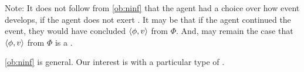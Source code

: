 \begin{note}
  Note:
  It does not follow from \autoref{ob:ninf} that the agent had a choice over how event develops, if the agent does not exert \ninf{}.
  It may be that if the agent continued the event, they would have concluded \(\langle \phi, v \rangle\) from \(\Phi\).
  And, may remain the case that \(\langle \phi, v \rangle\) from \(\Phi\) is a \fc{}.
\end{note}

\begin{note}
  \autoref{ob:ninf} is general.
  Our interest is with a particular type of \ninf{}.
\end{note}





\section{}
\label{cha:requs:sec:definition}

